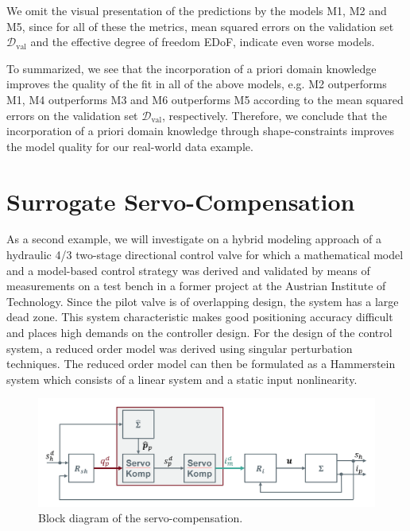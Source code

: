 We omit the visual presentation of the predictions by the models M1, M2 and M5, since for all of these the metrics, mean squared errors on the validation set $\mathcal{D}_{\text{val}}$ and the effective degree of freedom EDoF, indicate even worse models.

To summarized, we see that the incorporation of a priori domain knowledge improves the quality of the fit in all of the above models, e.g. M2 outperforms M1, M4 outperforms M3 and M6 outperforms M5 according to the mean squared errors on the validation set $\mathcal{D}_{\text{val}}$, respectively. Therefore, we conclude that the incorporation of a priori domain knowledge through shape-constraints improves the model quality for our real-world data example. 

\section{Surrogate Servo-Compensation} \label{sec:real-world-application2}

As a second example, we will investigate on a hybrid modeling approach of a hydraulic 4/3 two-stage directional control valve for which a mathematical model and a model-based control strategy was derived and validated by means of measurements on a test bench in a former project at the Austrian Institute of Technology. Since the pilot valve is of overlapping design, the system has a large dead zone. This system characteristic makes good positioning accuracy difficult and places high demands on the controller design. For the design of the control system, a reduced order model was derived using singular perturbation techniques. The reduced order model can then be formulated as a Hammerstein system which consists of a linear system and a static input nonlinearity.


\begin{figure}[H]
	\centering
	\includegraphics[width=0.8\columnwidth]{graphics/pgfplots/cha5/Bosch/blockschaltbild.png}
	\caption{Block diagram of the servo-compensation.}
	\label{fig:blockschaltbild}
\end{figure}


